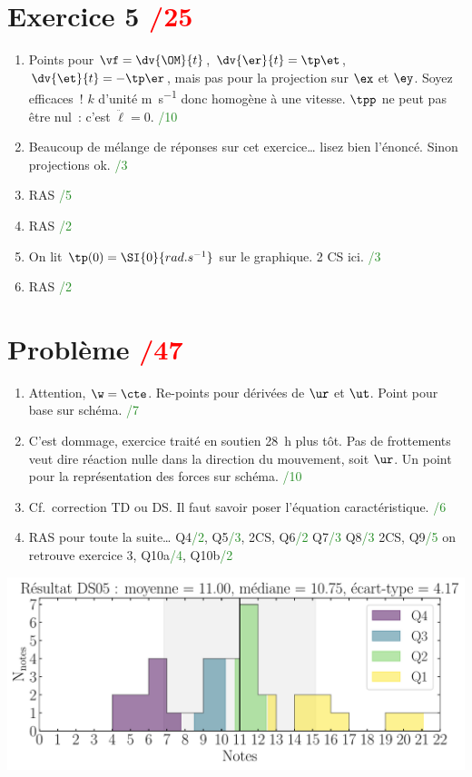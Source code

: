 \documentclass[a4paper, 10pt, final, garamond]{book}
\begin{document}
\begin{multicols}{2}
\section{Exercice 5 \hfill \textcolor{red}{/25}}
\begin{enumerate}
    \item Points pour $\vf = \dv{\OM}{t}$, $\dv{\er}{t} = \tp\et$, $\dv{\et}{t}
        = -\tp\er$, mais pas pour la projection sur $\ex$ et $\ey$. Soyez
        efficaces~! $k$ d'unité \si{m.s^{-1}} donc homogène à une vitesse.
        $\tpp$ ne peut pas être nul~: c'est $\ddot{\ell} = 0$.
        \hfill \textcolor{ForestGreen}{/10}
    \item Beaucoup de mélange de réponses sur cet exercice… lisez bien l'énoncé.
        Sinon projections ok. \hfill \textcolor{ForestGreen}{/3}
    \item RAS \hfill \textcolor{ForestGreen}{/5}
    \item RAS \hfill \textcolor{ForestGreen}{/2}
    \item On lit $\tp(0) = \SI{0}{rad.s^{-1}}$ sur le graphique. 2 CS ici.
        \hfill \textcolor{ForestGreen}{/3}
    \item RAS \hfill \textcolor{ForestGreen}{/2}
\end{enumerate}
\columnbreak
\section{Problème \hfill \textcolor{red}{/47}}
\begin{enumerate}
    \item Attention, $\w = \cte$. Re-points pour dérivées de $\ur$ et $\ut$.
        Point pour base sur schéma. \hfill \textcolor{ForestGreen}{/7}
    \item C'est dommage, exercice traité en soutien \SI{28}{h} plus tôt. Pas de
        frottements veut dire réaction nulle dans la direction du mouvement,
        soit $\ur$. Un point pour la représentation des forces sur schéma.
        \hfill \textcolor{ForestGreen}{/10}
    \item Cf.\ correction TD ou DS. Il faut savoir poser l'équation
        caractéristique. \hfill \textcolor{ForestGreen}{/6}
    \item RAS pour toute la suite… Q4\textcolor{ForestGreen}{/2},
        Q5\textcolor{ForestGreen}{/3}, 2CS, Q6\textcolor{ForestGreen}{/2}
        Q7\textcolor{ForestGreen}{/3} Q8\textcolor{ForestGreen}{/3} 2CS,
        Q9\textcolor{ForestGreen}{/5} on retrouve exercice 3,
        Q10a\textcolor{ForestGreen}{/4}, Q10b\textcolor{ForestGreen}{/2}
\end{enumerate}
\end{multicols}

\vfill

\begin{center}
    \includegraphics[width=.72\linewidth]{res_DS05.pdf}
\end{center}

\vfill
\end{document}

